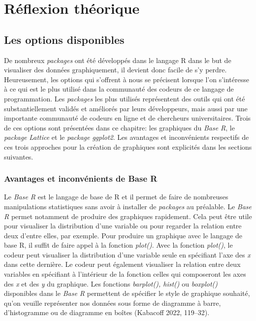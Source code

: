 \documentclass[
  letterpaper,
]{scrbook}
\begin{document}
\hypertarget{ruxe9flexion-thuxe9orique}{%
\section{Réflexion théorique}\label{ruxe9flexion-thuxe9orique}}

\hypertarget{les-options-disponibles}{%
\subsection{Les options disponibles}\label{les-options-disponibles}}

De nombreux \emph{packages} ont été développés dans le langage R dans le
but de visualiser des données graphiquement, il devient donc facile de
s'y perdre. Heureusement, les options qui s'offrent à nous se précisent
lorsque l'on s'intéresse à ce qui est le plus utilisé dans la communauté
des codeurs de ce langage de programmation. Les \emph{packages} les plus
utilisés représentent des outils qui ont été substantiellement validés
et améliorés par leurs développeurs, mais aussi par une importante
communauté de codeurs en ligne et de chercheurs universitaires. Trois de
ces options sont présentées dans ce chapitre: les graphiques du
\emph{Base R}, le \emph{package} \emph{Lattice} et le \emph{package}
\emph{ggplot2}. Les avantages et inconvénients respectifs de ces trois
approches pour la création de graphiques sont explicités dans les
sections suivantes.

\hypertarget{avantages-et-inconvuxe9nients-de-base-r}{%
\subsubsection{Avantages et inconvénients de Base
R}\label{avantages-et-inconvuxe9nients-de-base-r}}

Le \emph{Base R} est le langage de base de R et il permet de faire de
nombreuses manipulations statistiques sans avoir à installer de
\emph{packages} au préalable. Le \emph{Base R} permet notamment de
produire des graphiques rapidement. Cela peut être utile pour visualiser
la distribution d'une variable ou pour regarder la relation entre deux
d'entre elles, par exemple. Pour produire un graphique avec le langage
de base R, il suffit de faire appel à la fonction \emph{plot()}. Avec la
fonction \emph{plot()}, le codeur peut visualiser la distribution d'une
variable seule en spécifiant l'axe des \emph{x} dans cette dernière. Le
codeur peut également visualiser la relation entre deux variables en
spécifiant à l'intérieur de la fonction celles qui composeront les axes
des \emph{x} et des \emph{y} du graphique. Les fonctions
\emph{barplot(), hist()} ou \emph{boxplot()} disponibles dans le
\emph{Base R} permettent de spécifier le style de graphique souhaité,
qu'on veuille représenter nos données sous forme de diagramme à barre,
d'histogramme ou de diagramme en boîtes (Kabacoff 2022, 119--32).
\end{document}
